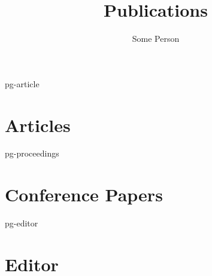 \documentclass[a4paper]{article}
\title{Publications}
\author{Some Person}
\begin{document}
\maketitle



\begin{btSect}{pg-article}
  \section*{Articles}
  \btPrintAll
\end{btSect}

\begin{btSect}{pg-proceedings}
  \section*{Conference Papers}
  \btPrintAll
\end{btSect}

\begin{btSect}{pg-editor}
  \section*{Editor}
  \btPrintAll
\end{btSect}
\end{document}
